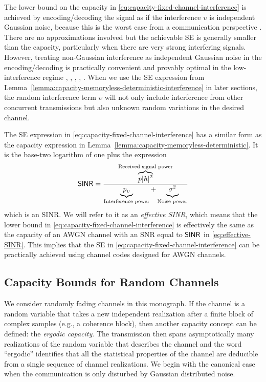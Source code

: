 The lower bound on the capacity in \eqref{eq:capacity-fixed-channel-interference} is achieved by encoding/decoding the signal as if the interference $\upsilon$ is independent Gaussian noise, because this is the worst case from a communication perspective \cite{Hassibi2003a}. There are no approximations involved but the achievable SE is generally smaller than the capacity, particularly when there are very strong interfering signals. However, treating non-Gaussian interference as independent Gaussian noise in the encoding/decoding is practically convenient and provably optimal in the low-interference regime \cite{Annapureddy2009a}, \cite{Annapureddy2011a}, \cite{Motahari2009a},  \cite{Shang2011b}, \cite{Shang2009b}. When we use the SE expression from Lemma~\ref{lemma:capacity-memoryless-deterministic-interference} in later sections, the random interference term $\upsilon$ will not only include interference from other concurrent transmissions but also unknown random variations in the desired channel.

The SE expression in \eqref{eq:capacity-fixed-channel-interference} has a similar form as the capacity expression in Lemma~\ref{lemma:capacity-memoryless-deterministic}. It is the base-two logarithm of one plus the expression  
\begin{equation} \label{eq:effective-SINR}
\mathsf{SINR} = \frac{\overbrace{p |h|^2  }^{\textrm{Received signal power}}}{\underbrace{  \vphantom{p |h|^2} p_{\upsilon}}_{\textrm{Interference power}} + \underbrace{ \vphantom{p |h|^2} \sigma^2}_{\textrm{Noise power}}}
\end{equation}
which is an \gls{SINR}. We will refer to it as an \emph{effective \gls{SINR}}, which means that the lower bound in \eqref{eq:capacity-fixed-channel-interference} is effectively the same as the capacity of an \gls{AWGN} channel with an \gls{SNR} equal to $\mathsf{SINR}$ in \eqref{eq:effective-SINR}. This implies that the SE in \eqref{eq:capacity-fixed-channel-interference} can be practically achieved using channel codes designed for \gls{AWGN} channels.

\subsection{Capacity Bounds for Random Channels}

We consider randomly fading channels in this monograph.
If the channel is a random variable that takes a new independent realization after a finite block of complex samples (e.g., a coherence block), then another capacity concept can be defined: the \emph{ergodic capacity}. The transmission then spans asymptotically many realizations of the random variable that describes the channel and the word ``ergodic'' identifies that all the statistical properties of the channel are deducible from a single sequence of channel realizations. We begin with the canonical case when the communication is only disturbed by Gaussian distributed noise. 

